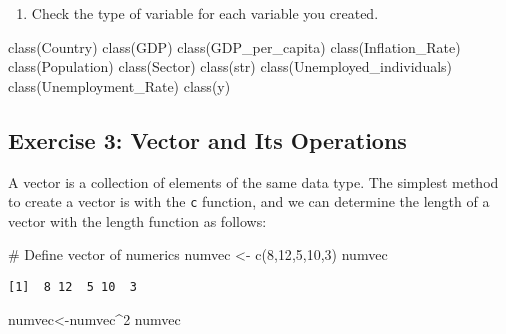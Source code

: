 \documentclass[
  letterpaper,
  DIV=11,
  numbers=noendperiod]{scrartcl}
\newenvironment{Shaded}{\begin{snugshade}}{\end{snugshade}}
\newcommand{\CommentTok}[1]{\textcolor[rgb]{0.37,0.37,0.37}{#1}}
\newcommand{\DecValTok}[1]{\textcolor[rgb]{0.68,0.00,0.00}{#1}}
\newcommand{\FunctionTok}[1]{\textcolor[rgb]{0.28,0.35,0.67}{#1}}
\newcommand{\NormalTok}[1]{\textcolor[rgb]{0.00,0.23,0.31}{#1}}
\newcommand{\OtherTok}[1]{\textcolor[rgb]{0.00,0.23,0.31}{#1}}
\newcommand{\SpecialCharTok}[1]{\textcolor[rgb]{0.37,0.37,0.37}{#1}}
\providecommand{\tightlist}{%
  \setlength{\itemsep}{0pt}\setlength{\parskip}{0pt}}\usepackage{longtable,booktabs,array}
\begin{document}
\begin{enumerate}
\def\labelenumi{\arabic{enumi}.}
\setcounter{enumi}{3}
\tightlist
\item
  Check the type of variable for each variable you created.
\end{enumerate}

\begin{Shaded}
\begin{Highlighting}[]
\FunctionTok{class}\NormalTok{(Country)}
\FunctionTok{class}\NormalTok{(GDP)}
\FunctionTok{class}\NormalTok{(GDP\_per\_capita)}
\FunctionTok{class}\NormalTok{(Inflation\_Rate)}
\FunctionTok{class}\NormalTok{(Population)}
\FunctionTok{class}\NormalTok{(Sector)}
\FunctionTok{class}\NormalTok{(str)}
\FunctionTok{class}\NormalTok{(Unemployed\_individuals)}
\FunctionTok{class}\NormalTok{(Unemployment\_Rate)}
\FunctionTok{class}\NormalTok{(y)}
\end{Highlighting}
\end{Shaded}

\subsection{Exercise 3: Vector and Its
Operations}\label{exercise-3-vector-and-its-operations}

A vector is a collection of elements of the same data type. The simplest
method to create a vector is with the \texttt{c} function, and we can
determine the length of a vector with the length function as follows:

\begin{Shaded}
\begin{Highlighting}[]
\CommentTok{\# Define vector of numerics}
\NormalTok{numvec }\OtherTok{\textless{}{-}} \FunctionTok{c}\NormalTok{(}\DecValTok{8}\NormalTok{,}\DecValTok{12}\NormalTok{,}\DecValTok{5}\NormalTok{,}\DecValTok{10}\NormalTok{,}\DecValTok{3}\NormalTok{)}
\NormalTok{numvec}
\end{Highlighting}
\end{Shaded}

\begin{verbatim}
[1]  8 12  5 10  3
\end{verbatim}

\begin{Shaded}
\begin{Highlighting}[]
\NormalTok{numvec}\OtherTok{\textless{}{-}}\NormalTok{numvec}\SpecialCharTok{\^{}}\DecValTok{2}
\NormalTok{numvec}
\end{Highlighting}
\end{Shaded}
\end{document}
